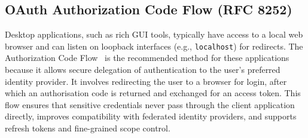 \documentclass[11pt,a4paper]{ivoa}
\begin{document}
\subsection{OAuth Authorization Code Flow (RFC 8252)}
Desktop applications, such as rich GUI tools, typically have access to a local web browser and
can listen on loopback interfaces (e.g., \texttt{localhost}) for redirects. The Authorization Code Flow~\citep{rfc8252}
is the recommended method for these applications because it allows secure delegation of authentication to the user's
preferred identity provider. It involves redirecting the user to a browser for login, after which an authorisation code
is returned and exchanged for an access token. This flow ensures that sensitive credentials never pass through the client
application directly, improves compatibility with federated identity providers, and supports refresh tokens and fine-grained
scope control.
\end{document}
